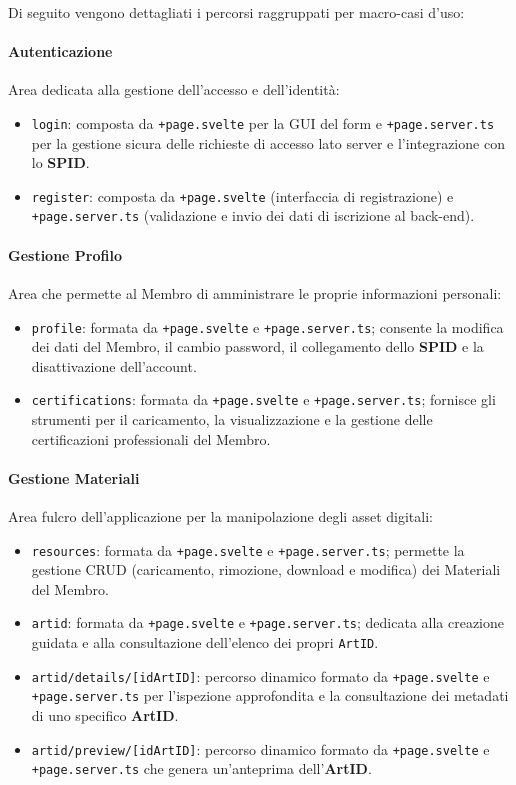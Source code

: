 Di seguito vengono dettagliati i percorsi raggruppati per macro-casi d'uso:

\paragraph{Autenticazione}
Area dedicata alla gestione dell'accesso e dell'identità:
\begin{itemize}
    \item \texttt{login}: composta da \texttt{+page.svelte} per la GUI del form e \texttt{+page.server.ts} per la gestione sicura delle richieste di accesso lato server e l'integrazione con lo \textbf{SPID}.
    \item \texttt{register}: composta da \texttt{+page.svelte} (interfaccia di registrazione) e \texttt{+page.server.ts} (validazione e invio dei dati di iscrizione al back-end).
\end{itemize}

\paragraph{Gestione Profilo}
Area che permette al Membro di amministrare le proprie informazioni personali:
\begin{itemize}
    \item \texttt{profile}: formata da \texttt{+page.svelte} e \texttt{+page.server.ts}; consente la modifica dei dati del Membro, il cambio password, il collegamento dello \textbf{SPID} e la disattivazione dell'account.
    \item \texttt{certifications}: formata da \texttt{+page.svelte} e \texttt{+page.server.ts}; fornisce gli strumenti per il caricamento, la visualizzazione e la gestione delle certificazioni professionali del Membro.
\end{itemize}

\paragraph{Gestione Materiali}
Area fulcro dell'applicazione per la manipolazione degli asset digitali:
\begin{itemize}
    \item \texttt{resources}: formata da \texttt{+page.svelte} e \texttt{+page.server.ts}; permette la gestione CRUD (caricamento, rimozione, download e modifica) dei Materiali del Membro.
    \item \texttt{artid}: formata da \texttt{+page.svelte} e \texttt{+page.server.ts}; dedicata alla creazione guidata e alla consultazione dell'elenco dei propri \texttt{ArtID}.
    \item \texttt{artid/details/[idArtID]}: percorso dinamico formato da \texttt{+page.svelte} e \texttt{+page.server.ts} per l'ispezione approfondita e la consultazione dei metadati di uno specifico \textbf{ArtID}.
    \item \texttt{artid/preview/[idArtID]}: percorso dinamico formato da \texttt{+page.svelte} e \texttt{+page.server.ts} che genera un'anteprima dell'\textbf{ArtID}.
\end{itemize}

